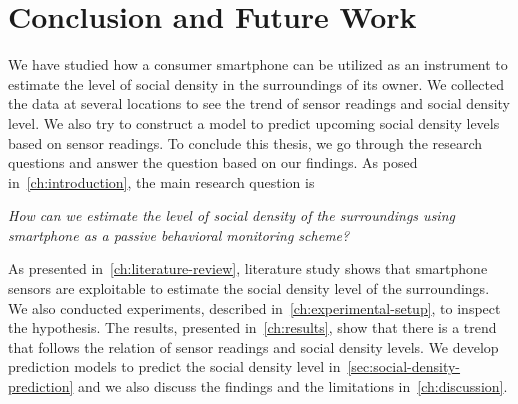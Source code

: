\chapter{Conclusion and Future Work}
\label{ch:conclusion-future-work} %
We have studied how a consumer smartphone can be utilized as an instrument to estimate the level of social density in the surroundings of its owner. We collected the data at several locations to see the trend of sensor readings and social density level. We also try to construct a model to predict upcoming social density levels based on sensor readings. To conclude this thesis, we go through the research questions and answer the question based on our findings. As posed in~\autoref{ch:introduction}, the main research question is

\begin{displayquote}
\textit{How can we estimate the level of social density of the surroundings using smartphone as a passive behavioral monitoring scheme?}
\end{displayquote}

\noindent
As presented in~\autoref{ch:literature-review}, literature study shows that smartphone sensors are exploitable to estimate the social density level of the surroundings. We also conducted experiments, described in~\autoref{ch:experimental-setup}, to inspect the hypothesis. The results, presented in~\autoref{ch:results}, show that there is a trend that follows the relation of sensor readings and social density levels. We develop prediction models to predict the social density level in~\autoref{sec:social-density-prediction} and we also discuss the findings and the limitations in~\autoref{ch:discussion}.

